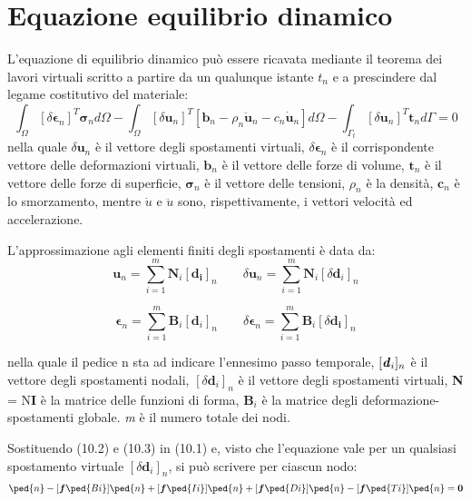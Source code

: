 \section{Equazione equilibrio dinamico}
L'equazione di equilibrio dinamico può essere ricavata mediante il teorema dei lavori virtuali 
scritto a partire da un qualunque istante $t_n$ e a prescindere dal legame costitutivo del materiale: 
\begin{equation}
	\int_\varOmega [\delta\boldsymbol{\epsilon}_n]^T \boldsymbol{\sigma}_nd\varOmega - \int_\varOmega[\delta\boldsymbol{u}_n]^T[\boldsymbol{b}_n-\rho_n\boldsymbol{\ddot{u}}_n-c_n \boldsymbol{\dot{u}}_n]d\varOmega - 
	\int_{\varGamma_t}[\delta\boldsymbol{u}_n]^T \boldsymbol{t}_n d\varGamma=0
\end{equation}
nella quale $\delta\boldsymbol{u}_n$ è il vettore degli spostamenti virtuali, $\delta\boldsymbol{\epsilon}_n$ 
è il corrispondente vettore delle deformazioni virtuali, $\boldsymbol{b}_n$ è il vettore 
delle forze di volume, $\boldsymbol{t}_n$ è il vettore delle forze di superficie, 
$\boldsymbol{\sigma}_n$ è il vettore delle tensioni, $\rho_n$ è la densità,  $\boldsymbol{c}_n$ 
è lo smorzamento, mentre $\dot{u}$ e $\ddot{u}$ sono, rispettivamente, i vettori velocità ed accelerazione.

L'approssimazione agli elementi finiti degli spostamenti è data da:
\begin{equation}
	\boldsymbol{u}_n = \sum_{i=1}^m \boldsymbol{N}_i[\boldsymbol{d_i}]_n  \qquad
	\delta \boldsymbol{u}_n = \sum_{i=1}^m \boldsymbol{N}_i[\delta \boldsymbol{d}_i]_n
\end{equation}

\begin{equation}
	\boldsymbol{\epsilon}_n = \sum_{i=1}^m \boldsymbol{B}_i[\boldsymbol{d}_i]_n \qquad
	\delta\boldsymbol{\epsilon}_n = \sum_{i=1}^m \boldsymbol{B}_i[\delta\boldsymbol{d_i}]_n
\end{equation}

nella quale il pedice n sta ad indicare l'ennesimo passo temporale, $[\textbf{\textit{d}}_i]_n$ 
è il vettore degli spostamenti nodali, $[\delta\boldsymbol{d}_i]_n$ è il vettore degli 
spostamenti virtuali, \textbf{N} = N\textbf{I} è la matrice delle funzioni di forma,
$\textbf{B}_{i}$ è la matrice degli deformazione-spostamenti globale. \textit{m} 
è il numero totale dei nodi.

Sostituendo (10.2) e (10.3) in (10.1) e, visto che l'equazione vale per un qualsiasi 
spostamento virtuale $[\delta\boldsymbol{d}_i]_n$, si può scrivere per ciascun nodo:
\begin{equation}
	[\boldsymbol{p}\ped{i}]\ped{n}-[\boldsymbol{f}\ped{Bi}]\ped{n}+[\boldsymbol{f}\ped{Ii}]\ped{n}+[\boldsymbol{f}\ped{Di}]\ped{n}-[\boldsymbol{f}\ped{Ti}]\ped{n}=\textbf{0}
\end{equation}


